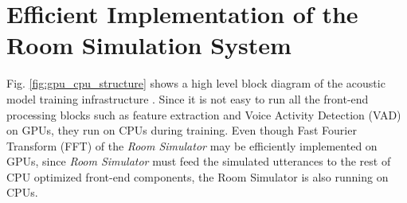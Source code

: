 \documentclass[a4paper]{article}
\begin{document}
\section{Efficient Implementation of the Room Simulation System}
  \label{sec:implementation}
%
Fig. \ref{fig:gpu_cpu_structure} shows a high level block diagram of
the acoustic model training infrastructure
\cite{E_Variani_INTERSPEECH_2017_01}. Since it is not easy to
run all the front-end processing blocks such as feature
extraction and Voice Activity Detection (VAD) on GPUs,
 they run on CPUs during training.
Even though Fast Fourier Transform (FFT) of the
\textit{Room Simulator} may be efficiently implemented on GPUs,
since
\textit{Room Simulator} must feed the simulated utterances
to the rest of CPU optimized front-end components, the Room Simulator
is also running on CPUs.
%
%
%
%
\end{document}
